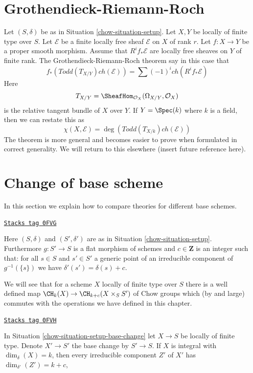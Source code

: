\section{Grothendieck-Riemann-Roch}
\label{chow-section-grr}
Let $(S, \delta)$ be as in
Situation \ref{chow-situation-setup}.
Let $X, Y$ be locally of finite type over $S$.
Let $\mathcal{E}$ be a finite locally free sheaf
${\mathcal E}$ on $X$ of rank $r$.
Let $f : X \to Y$ be a proper smooth morphism.
Assume that $R^if_*\mathcal{E}$ are locally free
sheaves on $Y$ of finite rank.
The Grothendieck-Riemann-Roch theorem say in this
case that
$$
f_*(Todd(T_{X/Y}) ch(\mathcal{E}))
=
\sum (-1)^i ch(R^if_*\mathcal{E})
$$
Here
$$
T_{X/Y} = \SheafHom_{\mathcal{O}_X}(\Omega_{X/Y}, \mathcal{O}_X)
$$
is the relative tangent bundle of $X$ over $Y$. If $Y = \Spec(k)$
where $k$ is a field, then we can restate this as
$$
\chi(X, \mathcal{E}) = \deg(Todd(T_{X/k}) ch(\mathcal{E}))
$$
The theorem is more general and becomes easier to prove
when formulated in correct generality. We will return to
this elsewhere (insert future reference here).

\section{Change of base scheme}
\label{chow-section-change-base}
In this section we explain how to compare theories for different
base schemes.

\begin{definition}
\label{chow-situation-setup-base-change}
\href{https://stacks.math.columbia.edu/tag/0FVG}{\texttt{Stacks tag 0FVG}}

Here  $(S, \delta)$ and $(S', \delta')$ are as in
Situation \ref{chow-situation-setup}. Furthermore $g : S' \to S$
is a flat morphism of schemes and $c \in \mathbf{Z}$
is an integer such that: for all $s \in S$ and $s' \in S'$
a generic point of an irreducible component of $g^{-1}(\{s\})$ we have
$\delta'(s') = \delta(s) + c$.
\end{definition}

We will see that for a scheme $X$ locally of finite type over $S$
there is a well defined map $\CH_k(X) \to \CH_{k + c}(X \times_S S')$
of Chow groups which (by and large) commutes with the operations
we have defined in this chapter.

\begin{lemma}
\label{chow-lemma-dimension-base-change}
\href{https://stacks.math.columbia.edu/tag/0FVH}{\texttt{Stacks tag 0FVH}}

In Situation \ref{chow-situation-setup-base-change} let $X \to S$ be locally
of finite type. Denote $X' \to S'$ the base change by $S' \to S$.
If $X$ is integral with $\dim_\delta(X) = k$, then
every irreducible component $Z'$ of $X'$ has $\dim_{\delta'}(Z') = k + c$,
\end{lemma}

